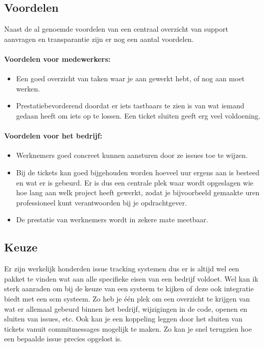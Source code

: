 \subsection{Voordelen}

Naast de al genoemde voordelen van een centraal overzicht van support aanvragen en transparantie zijn er nog een aantal voordelen.

\paragraph{Voordelen voor medewerkers:}

\begin{itemize}
  \item Een goed overzicht van taken waar je aan gewerkt hebt, of nog aan moet werken.
  \item Prestatiebevorderend doordat er iets tastbaars te zien is van wat iemand gedaan heeft om iets op te lossen. Een ticket sluiten geeft erg veel voldoening.
\end{itemize}

\paragraph{Voordelen voor het bedrijf:}

\begin{itemize}
  \item Werknemers goed concreet kunnen aansturen door ze issues toe te wijzen.
  \item Bij de tickets kan goed bijgehouden worden hoeveel uur ergens aan is besteed en wat er is gebeurd. Er is dus een centrale plek waar wordt opgeslagen wie hoe lang aan welk project heeft gewerkt, zodat je bijvoorbeeld gemaakte uren professioneel kunt verantwoorden bij je opdrachtgever.
  \item De prestatie van werknemers wordt in zekere mate meetbaar.
\end{itemize}

\subsection{Keuze}

Er zijn werkelijk honderden issue tracking systemen\cite{issuetracking} dus er is altijd wel een pakket te vinden wat aan alle specifieke eisen van een bedrijf voldoet. Wel kan ik sterk aanraden om bij de keuze van een systeem te kijken of deze ook integratie biedt met een {\sc scm} systeem. Zo heb je één plek om een overzicht te krijgen van wat er allemaal gebeurd binnen het bedrijf, wijzigingen in de code, openen en sluiten van issues, etc. Ook kan je een koppeling leggen door het sluiten van tickets vanuit commitmessages mogelijk te maken. Zo kan je snel terugzien hoe een bepaalde issue precies opgelost is.

